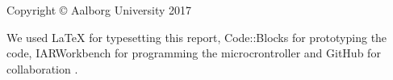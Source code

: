 \thispagestyle{empty}
{\small
\strut\vfill %
\noindent Copyright \copyright{} Aalborg University 2017\par
\vspace{0.2cm}
\noindent We used \LaTeX \: for typesetting this report,
Code::Blocks for prototyping the code,
IARWorkbench for programming the microcrontroller and
GitHub for collaboration \cite{GitHub}.
}
\clearpage
